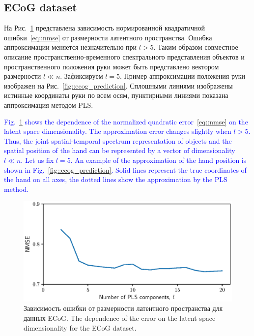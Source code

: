 \documentclass[12pt,twoside]{article}
\begin{document}
\subsection{ECoG dataset}

На Рис.~\ref{fig::ecog_n_comp} представлена зависимость нормированной квадратичной ошибки~\eqref{eq::nmse} от размерности латентного пространства. Ошибка аппроксимации меняется незначительно при $l > 5$.
Таким образом совместное описание пространственно-временного спектрального представления объектов и пространственного положения руки может быть представлено вектором размерности $l \ll n$.
Зафиксируем $l = 5$. 
Пример аппроксимации положения руки изображен на Рис.~\ref{fig::ecog_prediction}. 
Сплошными линиями изображены истинные координаты руки по всем осям, пунктирными линиями показана аппроксимация методом PLS.

\textcolor{blue}{
Fig.~\ref{fig::ecog_n_comp} shows the dependence of the normalized quadratic error~\eqref{eq::nmse} on the latent space dimensionality. The approximation error changes slightly when $l > 5$.
Thus, the joint spatial-temporal spectrum representation of objects and the spatial position of the hand can be represented by a vector of dimensionality $l \ll n$.
Let us fix $l = 5$. 
An example of the approximation of the hand position is shown in Fig.~\ref{fig::ecog_prediction}. 
Solid lines represent the true coordinates of the hand on all axes, the dotted lines show the approximation by the PLS method.}
 
\begin{figure}[!h]
	\centering
	\includegraphics[width=0.75\linewidth]{figs/ecog_n_comp}	
	\caption{Зависимость ошибки от размерности латентного пространства для данных ECoG. The dependence of the error on the latent space dimensionality for the ECoG dataset.}
	\label{fig::ecog_n_comp}
\end{figure}
\end{document}
